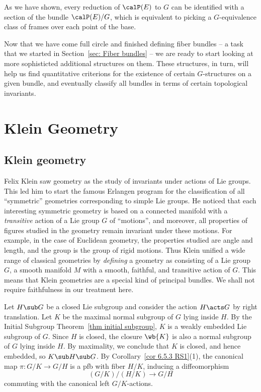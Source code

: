 As we have shown, every reduction of $\calP(E)$ to $G$ can be identified with a section of the bundle $\calP(E)\slash G$, which is equivalent to picking a $G$-equivalence class of frames over each point of the base.


Now that we have come full circle and finished defining fiber bundles -- a task that we started in Section~\ref{sec: Fiber bundles} -- we are ready to start looking at more sophisticted additional structures on them. These structures, in turn, will help us find quantitative criterions for the existence of certain $G$-structures on a given bundle, and eventually classify all bundles in terms of certain topological invariants.











\newpage
\section{Klein Geometry}

\subsection{Klein geometry}

Felix Klein saw geometry as the study of invariants under actions of Lie groups. This led him to start the famous Erlangen program for the classification of all ``symmetric'' geometries corresponding to simple Lie groups. He noticed that each interesting symmetric geometry is based on a connected manifold with a \emph{transitive} action of a Lie group $G$ of ``motions'', and moreover, all properties of figures studied in the geometry remain invariant under these motions. For example, in the case of Euclidean geometry, the properties studied are angle and length, and the group is the group of rigid motions. Thus Klein unified a wide range of classical geometries by \emph{defining} a geometry as consisting of a Lie group $G$, a smooth manifold $M$ with a smooth, faithful, and transitive action of $G$. This means that Klein geometries are a special kind of principal bundles. We shall not require faithfulness in our treatment here.

Let $H\sub G$ be a closed Lie subgroup and consider the action $H\acts G$ by right translation. Let $K$ be the maximal normal subgroup of $G$ lying inside $H$. By the Initial Subgroup Theorem~\ref{thm initial subgroup}, $K$ is a weakly embedded Lie subgroup of $G$. Since $H$ is closed, the closure $\wb{K}$ is also a normal subgroup of $G$ lying inside $H$. By maximality, we conclude that $K$ is closed, and hence embedded, so $K\sub H\sub G$. By Corollary~\ref{cor 6.5.3 RS1}(1), the canonical map $\pi:G\slash K\to G\slash H$ is a \gls{pfb} with fiber $H\slash K$, inducing a diffeomorphism
\[(G\slash K)\slash (H\slash K)\to G\slash H\]
commuting with the canonical left $G\slash K$-actions.

